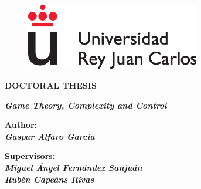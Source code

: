 \documentclass[a4paper,12pt,nofootinbib]{newsiambook}
\begin{document}




\begin{center}

\begin{figure}
\centering
\includegraphics[clip,width=7.6cm,trim=0cm 0cm 0cm 0cm]{Images/logoURJC.eps}                        %
\end{figure}


\vspace*{1.5cm}

\begin{center}                                                    %
{\Huge {\bf DOCTORAL THESIS}}
\end{center}



\vspace*{1.4cm}

\begin{center}                                                     %
	{\LARGE {\bf \textit{Game Theory, Complexity and Control}}}
\end{center}

\vspace*{1.2cm}







\begin{center}
 { \bf Author: \\
 	\vspace*{0.25cm}
 \large \textit{Gaspar Alfaro García}}
\end{center}

\vspace*{1cm}

\begin{center}
	{ \bf Supervisors: \\
		\vspace*{0.25cm}
		\textit{Miguel \'Angel Fern\'andez Sanju\'an}\\
		\vspace*{0.25cm} 
		\textit{Rub\'en Cape\'ans Rivas}}
\end{center}


\end{center}
\end{document}
